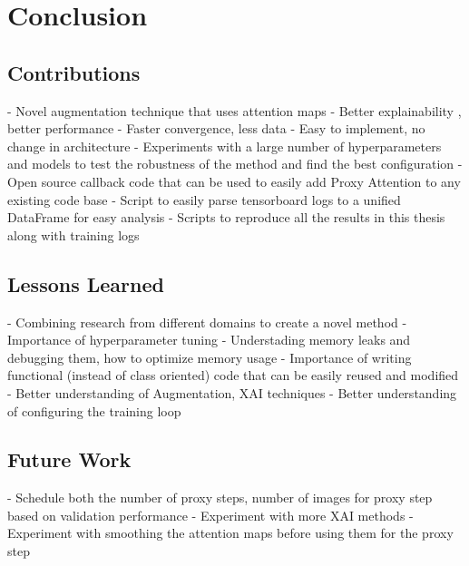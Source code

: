 \chapter{Conclusion}
\section{Contributions}
- Novel augmentation technique that uses attention maps
    - Better explainability , better performance
    - Faster convergence, less data
    - Easy to implement, no change in architecture
- Experiments with a large number of hyperparameters and models to test the robustness of the method and find the best configuration
- Open source callback code that can be used to easily add Proxy Attention to any existing code base
- Script to easily parse tensorboard logs to a unified DataFrame for easy analysis
- Scripts to reproduce all the results in this thesis along with training logs

\section{Lessons Learned}
- Combining research from different domains to create a novel method
- Importance of hyperparameter tuning
- Understading memory leaks and debugging them, how to optimize memory usage 
- Importance of writing functional (instead of class oriented) code that can be easily reused and modified 
- Better understanding of Augmentation, XAI techniques
- Better understanding of configuring the training loop

\section{Future Work}
- Schedule both the number of proxy steps, number of images for proxy step based on validation performance
- Experiment with more XAI methods
- Experiment with smoothing the attention maps before using them for the proxy step
